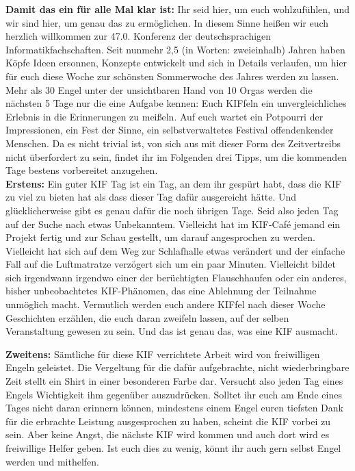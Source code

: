 
\textbf{Damit das ein für alle Mal klar ist:} Ihr seid hier, um euch wohlzufühlen, und wir sind hier, um genau das zu ermöglichen.
In diesem Sinne heißen wir euch herzlich willkommen zur 47.0. Konferenz der deutschsprachigen Informatikfachschaften.
Seit nunmehr 2,5 (in Worten: zweieinhalb) Jahren haben Köpfe Ideen ersonnen, Konzepte entwickelt und sich in Details verlaufen, um hier für euch diese Woche zur schönsten Sommerwoche des Jahres werden zu lassen.
Mehr als 30 Engel unter der unsichtbaren Hand von 10 Orgas werden die nächsten 5 Tage nur die eine Aufgabe kennen: Euch KIFfeln ein unvergleichliches Erlebnis in die Erinnerungen zu meißeln.
Auf euch wartet ein Potpourri der Impressionen, ein Fest der Sinne, ein selbstverwaltetes Festival offendenkender Menschen.
Da es nicht trivial ist, von sich aus mit dieser Form des Zeitvertreibs nicht überfordert zu sein, findet ihr im Folgenden drei Tipps, um die kommenden Tage bestens vorbereitet anzugehen.\\

\noindent\textbf{Erstens:}
Ein guter KIF Tag ist ein Tag, an dem ihr gespürt habt, dass die KIF zu viel zu bieten hat als dass dieser Tag dafür ausgereicht hätte.
Und glücklicherweise gibt es genau dafür die noch übrigen Tage.
Seid also jeden Tag auf der Suche nach etwas Unbekanntem.
Vielleicht hat im KIF-Café jemand ein Projekt fertig und zur Schau gestellt, um darauf angesprochen zu werden.
Vielleicht hat sich auf dem Weg zur Schlafhalle etwas verändert und der einfache Fall auf die Luftmatratze verzögert sich um ein paar Minuten.
Vielleicht bildet sich irgendwann irgendwo einer der berüchtigten Flauschhaufen oder ein anderes, bisher unbeobachtetes KIF-Phänomen, das eine Ablehnung der Teilnahme unmöglich macht.
Vermutlich werden euch andere KIFfel nach dieser Woche Geschichten erzählen, die euch daran zweifeln lassen, auf der selben Veranstaltung gewesen zu sein.
Und das ist genau das, was eine KIF ausmacht.

\pagebreak

\noindent\textbf{Zweitens:}
Sämtliche für diese KIF verrichtete Arbeit wird von freiwilligen Engeln geleistet.
Die Vergeltung für die dafür aufgebrachte, nicht wiederbringbare Zeit stellt ein Shirt in einer besonderen Farbe dar.
Versucht also jeden Tag eines Engels Wichtigkeit ihm gegenüber auszudrücken.
Solltet ihr euch am Ende eines Tages nicht daran erinnern können, mindestens einem Engel euren tiefsten Dank für die erbrachte Leistung ausgesprochen zu haben, scheint die KIF vorbei zu sein.
Aber keine Angst, die nächste KIF wird kommen und auch dort wird es freiwillige Helfer geben.
Ist euch dies zu wenig, könnt ihr auch gern selbst Engel werden und mithelfen.\\


